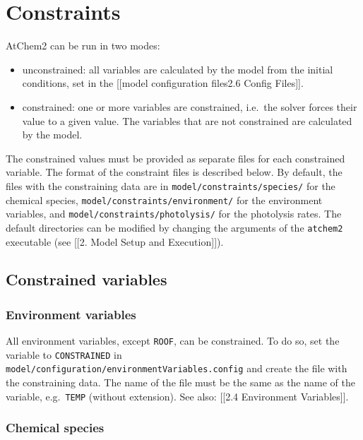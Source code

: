 \section{Constraints} \label{sec:constraints}

AtChem2 can be run in two modes:

\begin{itemize}
\item
  unconstrained: all variables are calculated by the model from the
  initial conditions, set in the {[}{[}model configuration
  files\textbar{}2.6 Config Files{]}{]}.
\item
  constrained: one or more variables are constrained, i.e.~the solver
  forces their value to a given value. The variables that are not
  constrained are calculated by the model.
\end{itemize}

The constrained values must be provided as separate files for each
constrained variable. The format of the constraint files is described
below. By default, the files with the constraining data are in
\texttt{model/constraints/species/} for the chemical species,
\texttt{model/constraints/environment/} for the environment variables,
and \texttt{model/constraints/photolysis/} for the photolysis rates. The
default directories can be modified by changing the arguments of the
\texttt{atchem2} executable (see {[}{[}2. Model Setup and
Execution{]}{]}).

\hypertarget{constrained-variables}{%
\subsection{Constrained variables}\label{constrained-variables}}

\hypertarget{environment-variables}{%
\subsubsection{Environment variables}\label{environment-variables}}

All environment variables, except \texttt{ROOF}, can be constrained. To
do so, set the variable to \texttt{CONSTRAINED} in
\texttt{model/configuration/environmentVariables.config} and create the
file with the constraining data. The name of the file must be the same
as the name of the variable, e.g.~\texttt{TEMP} (without extension). See
also: {[}{[}2.4 Environment Variables{]}{]}.

\hypertarget{chemical-species}{%
\subsubsection{Chemical species}\label{chemical-species}}

